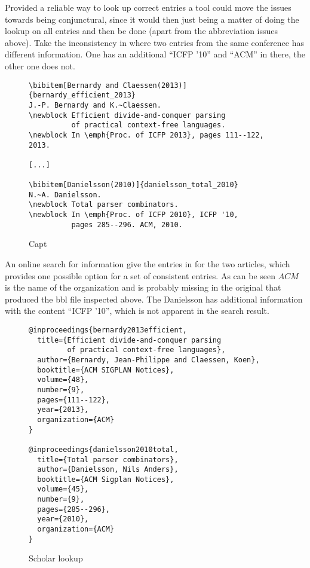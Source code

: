
Provided a reliable way to look up correct entries a tool could move
the issues towards being conjunctural, since it would then just being a
matter of doing the lookup on all entries and then be done (apart from
the abbreviation issues above).  Take the inconsistency in
 where two entries from the
same conference has different information.  One has an additional
``ICFP '10'' and ``ACM'' in there, the other one does not.

\begin{figure}
  \centering
  \begin{small}
\begin{verbatim}
\bibitem[Bernardy and Claessen(2013)]{bernardy_efficient_2013}
J.-P. Bernardy and K.~Claessen.
\newblock Efficient divide-and-conquer parsing 
          of practical context-free languages.
\newblock In \emph{Proc. of ICFP 2013}, pages 111--122, 2013.

[...]

\bibitem[Danielsson(2010)]{danielsson_total_2010}
N.~A. Danielsson.
\newblock Total parser combinators.
\newblock In \emph{Proc. of ICFP 2010}, ICFP '10,
          pages 285--296. ACM, 2010.
\end{verbatim}
  \end{small}
  \caption{Capt}
\label{fig:inconsistent_proceedings}
\end{figure}

An online search for {\bibtex} information give the entries in
 for the two articles, which
provides one possible option for a set of consistent entries.  As can
be seen $ACM$ is the name of the organization and is probably missing
in the original {\bibtex} that produced the bbl file inspected above.
The Danielsson has additional information with the content ``ICFP
'10'', which is not apparent in the search result.

\begin{figure}
  \centering
\begin{verbatim}
@inproceedings{bernardy2013efficient,
  title={Efficient divide-and-conquer parsing
         of practical context-free languages},
  author={Bernardy, Jean-Philippe and Claessen, Koen},
  booktitle={ACM SIGPLAN Notices},
  volume={48},
  number={9},
  pages={111--122},
  year={2013},
  organization={ACM}
}

@inproceedings{danielsson2010total,
  title={Total parser combinators},
  author={Danielsson, Nils Anders},
  booktitle={ACM Sigplan Notices},
  volume={45},
  number={9},
  pages={285--296},
  year={2010},
  organization={ACM}
}
\end{verbatim}
  \caption{Scholar lookup}
\label{fig:missing_org_scholar_lookup}
\end{figure}

